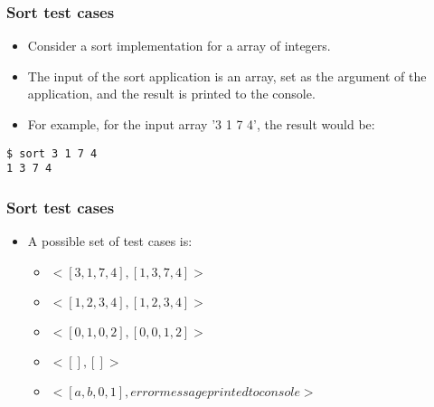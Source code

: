 \begin{frame}[hasprev=false, hasnext=true, fragile]
\frametitle{Sort test cases}
\label{example:sort-test-cases}

\begin{itemize}
	\item Consider a sort implementation for a array of integers.

	\item The input of the sort application is an array, set as the argument of
	the application, and the result is printed to the console.

	\item For example, for the input array '3 1 7 4', the result would be:
\end{itemize}
\begin{lstlisting}
$ sort 3 1 7 4
1 3 7 4
\end{lstlisting}
\end{frame}


\begin{frame}[hasprev=true, hasnext=false, fragile]
\frametitle{Sort test cases}

\begin{itemize}
	\item A possible set of test cases is:
	\begin{itemize}
		\item $<[3, 1, 7, 4], [1, 3, 7, 4]>$
		\item $<[1, 2, 3, 4], [1, 2, 3, 4]>$
		\item $<[0, 1, 0, 2], [0, 0, 1, 2]>$
		\item $<[], []>$
		\item $<[a, b, 0, 1], error message printed to console>$
	\end{itemize}
\end{itemize}
\end{frame}
